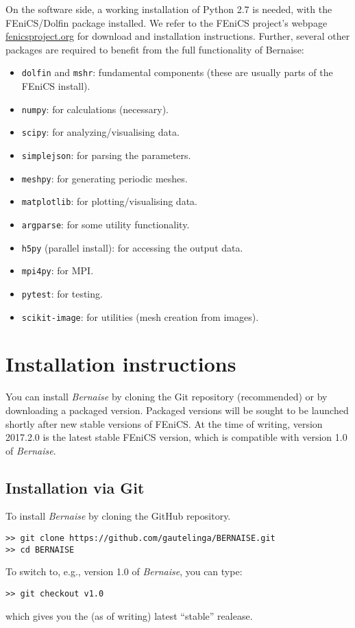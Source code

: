 \documentclass[a4paper,10pt]{article}
\begin{document}
On the software side, a working installation of Python 2.7 is needed, with the FEniCS/Dolfin package installed.
We refer to the FEniCS project's webpage \url{fenicsproject.org} for download and installation instructions.
Further, several other packages are required to benefit from the full functionality of Bernaise:
\begin{itemize}
\item \texttt{dolfin} and \texttt{mshr}: fundamental components (these are usually parts of the FEniCS install).
\item \texttt{numpy}: for calculations (necessary).
\item \texttt{scipy}: for analyzing/visualising data.
\item \texttt{simplejson}: for parsing the parameters.
\item \texttt{meshpy}: for generating periodic meshes.
\item \texttt{matplotlib}: for plotting/visualising data.
\item \texttt{argparse}: for some utility functionality.
\item \texttt{h5py} (parallel install): for accessing the output data.
\item \texttt{mpi4py}: for MPI.
\item \texttt{pytest}: for testing.
\item \texttt{scikit-image}: for utilities (mesh creation from images).
\end{itemize}

\section{Installation instructions}
You can install \emph{Bernaise} by cloning the Git repository (recommended) or by downloading a packaged version.
Packaged versions will be sought to be launched shortly after new stable versions of FEniCS.
At the time of writing, version 2017.2.0 is the latest stable FEniCS version, which is compatible with version 1.0 of \emph{Bernaise}.

\subsection{Installation via Git}
To install \emph{Bernaise} by cloning the GitHub repository.
\begin{verbatim}
>> git clone https://github.com/gautelinga/BERNAISE.git
>> cd BERNAISE
\end{verbatim}
To switch to, e.g., version 1.0 of \emph{Bernaise}, you can type:
\begin{verbatim}
>> git checkout v1.0
\end{verbatim}
which gives you the (as of writing) latest ``stable'' realease.
\end{document}
